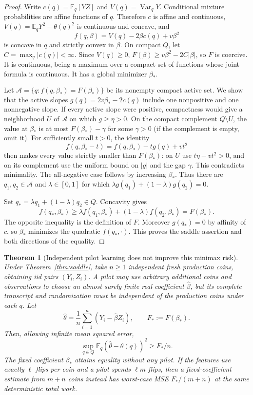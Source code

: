 \documentclass[11pt]{article}
\newtheorem{theorem}{Theorem}
\newcommand{\E}{\mathbb E}
\newcommand{\Var}{\operatorname{Var}}
\begin{document}
\begin{proof}
Write $c(q)=\E_q[YZ]$ and $V(q)=\Var_qY$. Conditional mixture probabilities
are affine functions of $q$. Therefore $c$ is affine and continuous,
$V(q)=\E_qY^2-\theta(q)^2$ is continuous and concave, and
\[
 f(q,\beta)=V(q)-2\beta c(q)+v\beta^2
\]
is concave in $q$ and strictly convex in $\beta$.
On compact $Q$, let $C=\max_q|c(q)|<\infty$. Since $V(q)\ge0$,
$F(\beta)\ge v\beta^2-2C|\beta|$, so $F$ is coercive. It is continuous,
being a maximum over a compact set of functions whose joint formula is
continuous. It has a global minimizer $\beta_*$.

Let $\mathcal A=\{q:f(q,\beta_*)=F(\beta_*)\}$ be its nonempty compact active
set. We show that the active slopes
$g(q)=2v\beta_*-2c(q)$ include one nonpositive and one nonnegative slope.
If every active slope were positive, compactness would give a neighborhood
$U$ of $\mathcal A$ on which $g\ge\eta>0$. On the compact complement
$Q\setminus U$, the value at $\beta_*$ is at most $F(\beta_*)-\gamma$ for
some $\gamma>0$ (if the complement is empty, omit it). For sufficiently small
$t>0$, the identity
\[
 f(q,\beta_*-t)=f(q,\beta_*)-t g(q)+vt^2
\]
then makes every value strictly smaller than $F(\beta_*)$: on $U$ use
$t\eta-vt^2>0$, and on its complement use the uniform bound on $|g|$ and
the gap $\gamma$. This contradicts minimality. The all-negative case follows
by increasing $\beta_*$. Thus there are $q_1,q_2\in\mathcal A$ and
$\lambda\in[0,1]$ for which
$\lambda g(q_1)+(1-\lambda)g(q_2)=0$.

Set $q_*=\lambda q_1+(1-\lambda)q_2\in Q$. Concavity gives
\[
 f(q_*,\beta_*)\ge\lambda f(q_1,\beta_*)+(1-\lambda)f(q_2,\beta_*)
 =F(\beta_*).
\]
The opposite inequality is the definition of $F$. Moreover $g(q_*)=0$
by affinity of $c$, so $\beta_*$ minimizes the quadratic $f(q_*,\cdot)$.
This proves the saddle assertion and both directions of the equality.
\end{proof}

\begin{theorem}[Independent pilot learning does not improve this minimax risk]
Under Theorem~\ref{thm:saddle}, take $n\ge1$ independent fresh production
coins, obtaining iid pairs $(Y_i,Z_i)$. A pilot may use arbitrary additional
coins and observations to choose an almost surely finite real coefficient
$\widehat\beta$, but its complete transcript and randomization must be
independent of the production coins under each $q$. Let
\[
 \widehat\theta=\frac1n\sum_{i=1}^n(Y_i-\widehat\beta Z_i),\qquad
 F_*:=F(\beta_*).
\]
Then, allowing infinite mean squared error,
\[
 \sup_{q\in Q}\E_q(\widehat\theta-\theta(q))^2\ge F_*/n.
\]
The fixed coefficient $\beta_*$ attains equality without any pilot. If the
features use exactly $\ell$ flips per coin and a pilot spends $\ell m$ flips,
then a fixed-coefficient estimate from $m+n$ coins instead has worst-case
MSE $F_*/(m+n)$ at the same deterministic total work.
\end{theorem}
\end{document}
